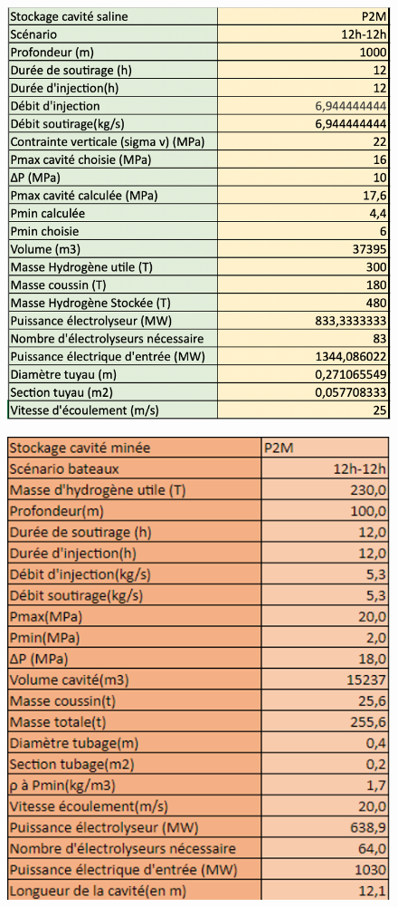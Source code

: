 \documentclass[11pt,french,a4paper]{article}
\begin{document}
\begin{figure}
\centering
\begin{minipage}{.5\textwidth}
  \centering
  \includegraphics[width=0.8\linewidth]{image/annexe/config_cavite_minee/c1.png}
  \label{fig:test1}
\end{minipage}%
\begin{minipage}{.5\textwidth}
  \centering
  \includegraphics[width=0.7\linewidth]{image/annexe/config_cavite_minee/c2.png}
  \label{fig:test2}
\end{minipage}
\end{figure}
\end{document}

